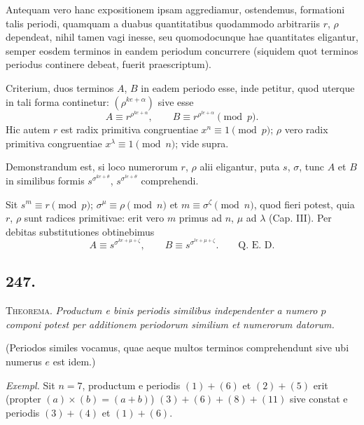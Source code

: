 \documentclass[12pt]{article}
\begin{document}
Antequam vero hanc expositionem ipsam aggrediamur, ostendemus, formationi talis periodi, quamquam a duabus quantitatibus quodammodo arbitrariis $r$, $\rho$ dependeat, nihil tamen vagi inesse, seu quomodocunque hae quantitates eligantur, semper eosdem terminos in eandem periodum concurrere (siquidem quot terminos periodus continere debeat, fuerit praescriptum).

Criterium, duos terminos $A$, $B$ in eadem periodo esse, inde petitur, quod uterque in tali forma continetur: $(\rho^{ke+\alpha})$ sive esse
\[
A\equiv r^{\rho^{ke+\alpha}},\qquad B\equiv r^{\rho^{le+\alpha}}\pmod p.
\]
Hic autem $r$ est radix primitiva congruentiae $x^n\equiv 1\pmod p$; $\rho$ vero radix primitiva congruentiae $x^\lambda\equiv 1\pmod n$; vide supra.

Demonstrandum est, si loco numerorum $r$, $\rho$ alii eligantur, puta $s$, $\sigma$, tunc $A$ et $B$ in similibus formis $s^{\sigma^{ke+\theta}}$, $s^{\sigma^{le+\theta}}$ comprehendi.

Sit $s^m\equiv r\pmod p$; $\sigma^\mu\equiv \rho\pmod n$ et $m\equiv \sigma^\zeta\pmod n$, quod fieri potest, quia $r$, $\rho$ sunt radices primitivae: erit vero $m$ primus ad $n$, $\mu$ ad $\lambda$ (Cap. III). Per debitas substitutiones obtinebimus
\[
A\equiv s^{\sigma^{ke+\mu+\zeta}},\qquad B\equiv s^{\sigma^{le+\mu+\zeta}}. \qquad \text{Q. E. D.}
\]

\subsection*{247.}
\textsc{Theorema.} \textit{Productum e binis periodis similibus independenter a numero $p$ componi potest per additionem periodorum similium et numerorum datorum.}

(Periodos similes vocamus, quae aeque multos terminos comprehendunt sive ubi numerus $e$ est idem.)

\textit{Exempl.} Sit $n=7$, productum e periodis $(1)+(6)$ et $(2)+(5)$ erit (propter $(a)\times(b)=(a+b)$) $(3)+(6)+(8)+(11)$ sive constat e periodis $(3)+(4)$ et $(1)+(6)$.
\end{document}
